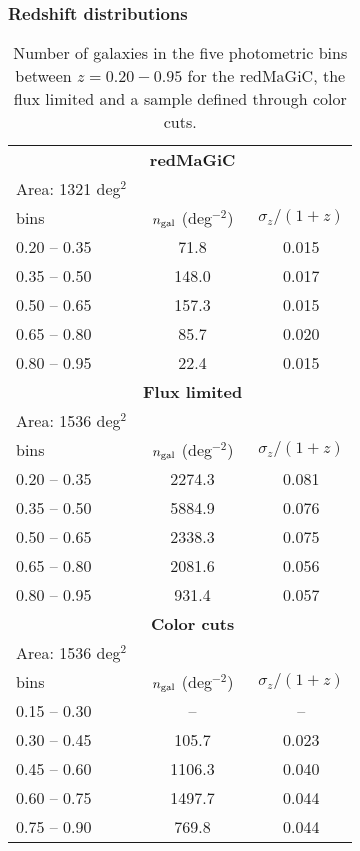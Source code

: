 \documentclass[a4paper,fleqn,usenatbib]{mnras}
\begin{document}
\subsubsection{Redshift distributions}
\label{subsub: distributions}

\begin{table}
\centering
\caption{Number of galaxies in the five photometric bins between $z=0.20-0.95$ for the redMaGiC, the  flux limited and a sample defined through color cuts.}
 \label{tab: bin_n_size}
 \begin{tabular}{lcc}
  \hhline{===}
   &   {\textbf{redMaGiC}}&  \\
  Area: 1321 deg$^2$ & & \\
  \hline
   bins&  $n_{\mbox{\scriptsize{gal}}}$ (deg$^{-2}$)   & ${\sigma}_z/(1+z)$ \\
  \hline
  0.20 -- 0.35 & 71.8  & 0.015 \\
  0.35 -- 0.50 & 148.0 & 0.017 \\
  0.50 -- 0.65 &  157.3 & 0.015 \\
  0.65 -- 0.80 &  85.7 & 0.020 \\
  0.80 -- 0.95 &  22.4 & 0.015 \\
  \hline
  \hhline{===}
   & {\textbf{Flux limited}} &  \\
   Area: 1536 deg$^2$ & & \\
   \hline
   bins&  $n_{\mbox{\scriptsize{gal}}}$ (deg$^{-2}$)   & ${\sigma}_z/(1+z)$  \\
  \hline
  0.20 -- 0.35 & 2274.3 & 0.081  \\
  0.35 -- 0.50 & 5884.9  & 0.076  \\
  0.50 -- 0.65 & 2338.3 & 0.075 \\
  0.65 -- 0.80 & 2081.6 & 0.056 \\
  0.80 -- 0.95 & 931.4 & 0.057 \\
  \hline
  \hhline{===}
  & {\textbf{Color cuts}} &  \\
   Area: 1536 deg$^2$ & & \\
   \hline
   bins&   $n_{\mbox{\scriptsize{gal}}}$ (deg$^{-2}$)    & ${\sigma}_{z}/(1+z)$  \\
  \hline
  0.15 -- 0.30 & -- & -- \\
  0.30 -- 0.45 & 105.7  & 0.023 \\
  0.45 -- 0.60 & 1106.3 & 0.040 \\
  0.60 -- 0.75 & 1497.7 & 0.044 \\
  0.75 -- 0.90 & 769.8 & 0.044 \\
  \hline
 \end{tabular}
\end{table}
\end{document}
